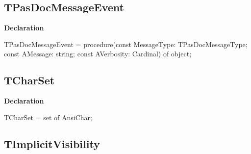 \documentclass{report}
\newif\ifpdf
\begin{document}
\subsection*{TPasDocMessageEvent}
\fi
\label{PasDoc_Types-TPasDocMessageEvent}
\begin{list}{}{
\setlength{\itemindent}{0cm}
\setlength{\listparindent}{0cm}
\setlength{\leftmargin}{\evensidemargin}
\addtolength{\leftmargin}{\tmplength}
\settowidth{\labelsep}{X}
\addtolength{\leftmargin}{\labelsep}
\setlength{\labelwidth}{\tmplength}
}
\item[\textbf{Declaration}\hfill]
\ifpdf
\begin{flushleft}
\fi
\begin{ttfamily}
TPasDocMessageEvent = procedure(const MessageType: TPasDocMessageType; const AMessage: string; const AVerbosity: Cardinal) of object;\end{ttfamily}

\ifpdf
\end{flushleft}
\fi

\end{list}
\ifpdf
\subsection*{\large{\textbf{TCharSet}}\normalsize\hspace{1ex}\hrulefill}
\else
\subsection*{TCharSet}
\fi
\label{PasDoc_Types-TCharSet}
\begin{list}{}{
\setlength{\itemindent}{0cm}
\setlength{\listparindent}{0cm}
\setlength{\leftmargin}{\evensidemargin}
\addtolength{\leftmargin}{\tmplength}
\settowidth{\labelsep}{X}
\addtolength{\leftmargin}{\labelsep}
\setlength{\labelwidth}{\tmplength}
}
\item[\textbf{Declaration}\hfill]
\ifpdf
\begin{flushleft}
\fi
\begin{ttfamily}
TCharSet = set of AnsiChar;\end{ttfamily}

\ifpdf
\end{flushleft}
\fi

\end{list}
\ifpdf
\subsection*{\large{\textbf{TImplicitVisibility}}\normalsize\hspace{1ex}\hrulefill}
\else
\end{document}
